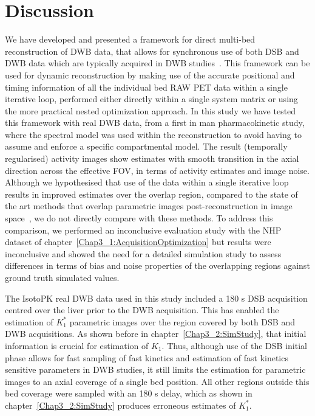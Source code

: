 \newpage

%


\section{Discussion}

We have developed and presented a framework for direct multi-bed reconstruction of DWB data, that allows for synchronous use of both DSB and DWB data which are typically acquired in DWB studies~\cite{Karakatsanis2013}. 
This framework can be used for dynamic reconstruction by making use of the accurate positional and timing information of all the individual bed RAW PET data within a single iterative loop, performed either directly within a single system matrix or using the more practical nested optimization approach.
In this study we have tested this framework with real DWB data, from a first in man pharmacokinetic study, where the spectral model was used within the reconstruction to avoid having to assume and enforce a specific compartmental model.
The result (temporally regularised) activity images show estimates with smooth transition in the axial direction across the effective FOV, in terms of activity estimates and image noise. Although we hypothesised that use of the data within a single iterative loop results in improved estimates over the overlap region, compared to the state of the art methods that overlap parametric images post-reconstruction in image space~\cite{Karakatsanis2016a,Hu2020}, we do not directly compare with these methods. To address this comparison, we performed an inconclusive evaluation study with the NHP dataset of chapter~\ref{Chap3_1:AcquisitionOptimization} but results were inconclusive and showed the need for a detailed simulation study to assess differences in terms of bias and noise properties of the overlapping regions against ground truth simulated values. 

The IsotoPK real DWB data used in this study included a 180 s DSB acquisition centred over the liver prior to the DWB acquisition. This has enabled the estimation of $K_1^{*}$ parametric images over the region covered by both DSB and DWB acquisitions. As shown before in chapter~\ref{Chap3_2:SimStudy}, that initial information is crucial for estimation of $K_1$. Thus, although use of the DSB initial phase allows for fast sampling of fast kinetics and estimation of fast kinetics sensitive parameters in DWB studies, it still limits the estimation for parametric images to an axial coverage of a single bed position. All other regions outside this bed coverage were sampled with an 180 s delay, which as shown in chapter~\ref{Chap3_2:SimStudy} produces erroneous estimates of $K_1^{*}$. 

